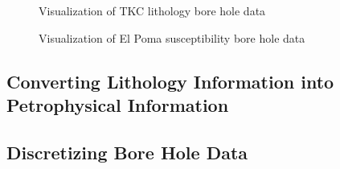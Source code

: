  \begin{figure} [h]
    \centering
    \caption{Visualization of TKC lithology bore hole data}
    \label{fig:TKCBHvis}
\end{figure}

 \begin{figure} [h]
    \centering
    \caption{Visualization of El Poma susceptibility bore hole data}
    \label{fig:EPBHvis}
\end{figure}

\subsection{Converting Lithology Information into Petrophysical Information}
\label{subsec:lithBH}

\subsection{Discretizing Bore Hole Data}
\label{subsec:discBH}

